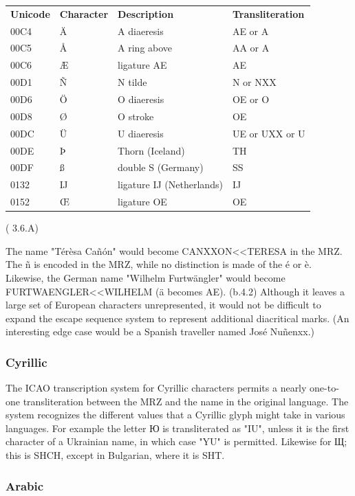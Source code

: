 \begin{tabular}{l|l|l|l}
\textbf{Unicode} & \textbf{Character} & \textbf{Description} &
\textbf{Transliteration} \\
00C4 & Ä & A diaeresis & AE or A \\
00C5 & Å & A ring above & AA or A \\
00C6 & Æ & ligature AE & AE \\
00D1 & Ñ & N tilde & N or NXX \\
00D6 & Ö & O diaeresis & OE or O \\
00D8 & Ø & O stroke & OE \\
00DC & Ü & U diaeresis & UE or UXX or U \\
00DE & Þ & Thorn (Iceland) & TH \\
00DF & ß & double S (Germany) & SS \\
0132 & Ĳ & ligature IJ (Netherlands) & IJ \\
0152 & Œ & ligature OE & OE \\
\end{tabular} (\parencite{ICAO9309} 3.6.A)

The name "Térèsa Cañón" would become CANXXON<<TERESA in the MRZ. The ñ is
encoded in the MRZ, while no distinction is made of the é or è. Likewise, the
German name "Wilhelm Furtwängler" would become FURTWAENGLER<<WILHELM (ä becomes
AE). (b.4.2) Although it leaves a large set of European characters
unrepresented, it would not be difficult to expand the escape sequence system to
represent additional diacritical marks. (An interesting edge case would be a
Spanish traveller named José Nuñenxx.)

\subsubsection{Cyrillic}

The ICAO transcription system for Cyrillic characters permits a nearly
one-to-one transliteration between the MRZ and the name in the original
language. The system recognizes the different values that a Cyrillic glyph might
take in various languages. For example the letter Ю is transliterated as "IU",
unless it is the first character of a Ukrainian name, in which case "YU" is
permitted. Likewise for Щ; this is SHCH, except in Bulgarian, where it is SHT.

\subsubsection{Arabic}

